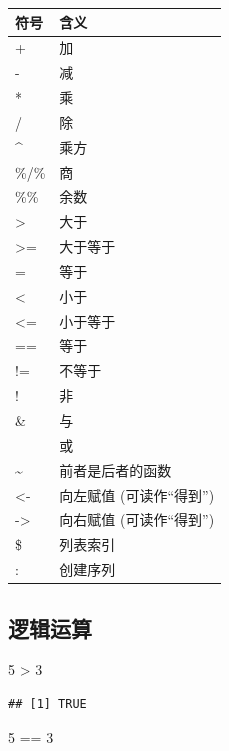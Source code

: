 \documentclass[
]{book}
\newenvironment{Shaded}{\begin{snugshade}}{\end{snugshade}}
\newcommand{\DecValTok}[1]{\textcolor[rgb]{0.00,0.00,0.81}{#1}}
\newcommand{\SpecialCharTok}[1]{\textcolor[rgb]{0.00,0.00,0.00}{#1}}
\begin{document}
\begin{longtable}[]{@{}ll@{}}
\toprule
符号 & 含义 \\
\midrule
\endhead
+ & 加 \\
- & 减 \\
* & 乘 \\
/ & 除 \\
\^{} & 乘方 \\
\%/\% & 商 \\
\%\% & 余数 \\
\textgreater{} & 大于 \\
\textgreater= & 大于等于 \\
= & 等于 \\
\textless{} & 小于 \\
\textless= & 小于等于 \\
== & 等于 \\
!= & 不等于 \\
! & 非 \\
\& & 与 \\
\textbar{} & 或 \\
\textasciitilde{} & 前者是后者的函数 \\
\textless- & 向左赋值 (可读作``得到'') \\
-\textgreater{} & 向右赋值 (可读作``得到'') \\
\$ & 列表索引 \\
: & 创建序列 \\
\bottomrule
\end{longtable}

\newpage

\hypertarget{ux903bux8f91ux8fd0ux7b97}{%
\subsection{逻辑运算}\label{ux903bux8f91ux8fd0ux7b97}}

\begin{Shaded}
\begin{Highlighting}[]
\DecValTok{5} \SpecialCharTok{\textgreater{}} \DecValTok{3}
\end{Highlighting}
\end{Shaded}

\begin{verbatim}
## [1] TRUE
\end{verbatim}

\begin{Shaded}
\begin{Highlighting}[]
\DecValTok{5} \SpecialCharTok{==} \DecValTok{3}
\end{Highlighting}
\end{Shaded}
\end{document}
